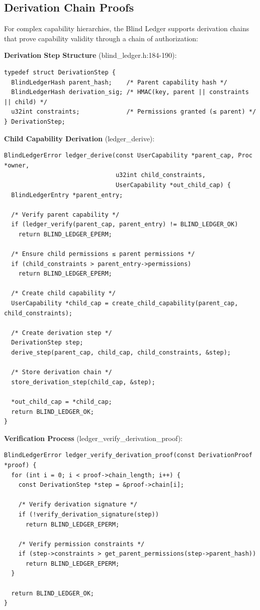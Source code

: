 \documentclass[11pt,letterpaper]{article}
\begin{document}
\subsection{Derivation Chain Proofs}

For complex capability hierarchies, the Blind Ledger supports derivation chains that prove capability validity through a chain of authorization:

\textbf{Derivation Step Structure} (blind_ledger.h:184-190):

\begin{lstlisting}
typedef struct DerivationStep {
  BlindLedgerHash parent_hash;    /* Parent capability hash */
  BlindLedgerHash derivation_sig; /* HMAC(key, parent || constraints || child) */
  u32int constraints;             /* Permissions granted (≤ parent) */
} DerivationStep;
\end{lstlisting}

\textbf{Child Capability Derivation} (ledger\_derive):

\begin{lstlisting}
BlindLedgerError ledger_derive(const UserCapability *parent_cap, Proc *owner,
                               u32int child_constraints,
                               UserCapability *out_child_cap) {
  BlindLedgerEntry *parent_entry;
  
  /* Verify parent capability */
  if (ledger_verify(parent_cap, parent_entry) != BLIND_LEDGER_OK)
    return BLIND_LEDGER_EPERM;
    
  /* Ensure child permissions ≤ parent permissions */
  if (child_constraints > parent_entry->permissions)
    return BLIND_LEDGER_EPERM;
    
  /* Create child capability */
  UserCapability *child_cap = create_child_capability(parent_cap, child_constraints);
  
  /* Create derivation step */
  DerivationStep step;
  derive_step(parent_cap, child_cap, child_constraints, &step);
  
  /* Store derivation chain */
  store_derivation_step(child_cap, &step);
  
  *out_child_cap = *child_cap;
  return BLIND_LEDGER_OK;
}
\end{lstlisting}

\textbf{Verification Process} (ledger\_verify\_derivation\_proof):

\begin{lstlisting}
BlindLedgerError ledger_verify_derivation_proof(const DerivationProof *proof) {
  for (int i = 0; i < proof->chain_length; i++) {
    const DerivationStep *step = &proof->chain[i];
    
    /* Verify derivation signature */
    if (!verify_derivation_signature(step))
      return BLIND_LEDGER_EPERM;
      
    /* Verify permission constraints */
    if (step->constraints > get_parent_permissions(step->parent_hash))
      return BLIND_LEDGER_EPERM;
  }
  
  return BLIND_LEDGER_OK;
}
\end{lstlisting}
\end{document}
